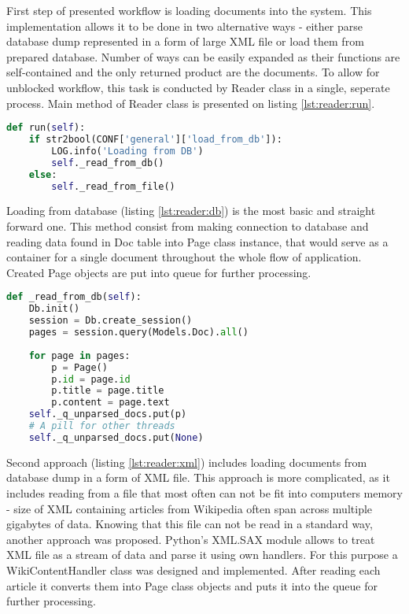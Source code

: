 First step of presented workflow is loading documents into the system. This implementation allows it to be done in two alternative ways - either parse database dump represented in a form of large XML file or load them from prepared database. Number of ways can be easily expanded as their functions are self-contained and the only returned product are the documents. To allow for unblocked workflow, this task is conducted by Reader class in a single, seperate process. Main method of Reader class is presented on listing \ref{lst:reader:run}.


\begin{lstlisting}[language=Python, caption={Reader.run() - Reader class process main method}, label={lst:reader:run}]
def run(self):
    if str2bool(CONF['general']['load_from_db']):
        LOG.info('Loading from DB')
        self._read_from_db()
    else:
        self._read_from_file()
\end{lstlisting}

Loading from database (listing \ref{lst:reader:db}) is the most basic and straight forward one. This method consist from making connection to database and reading data found in Doc table into Page class instance, that would serve as a container for a single document throughout the whole flow of application. Created Page objects are put into queue for further processing.

\begin{lstlisting}[language=Python, caption={Reader.\_read\_from\_db() - reading docs from database}, label={lst:reader:db}]
def _read_from_db(self):
	Db.init()
	session = Db.create_session()
	pages = session.query(Models.Doc).all()
	
	for page in pages:
		p = Page()
		p.id = page.id
		p.title = page.title
		p.content = page.text
	self._q_unparsed_docs.put(p)
	# A pill for other threads
	self._q_unparsed_docs.put(None)
\end{lstlisting}

Second approach (listing \ref{lst:reader:xml}) includes loading documents from database dump in a form of XML file. This approach is more complicated, as it includes reading from a file that most often can not be fit into computers memory - size of XML containing articles from Wikipedia often span across multiple gigabytes of data. Knowing that this file can not be read in a standard way, another approach was proposed. Python's XML.SAX module allows to treat XML file as a stream of data and parse it using own handlers. For this purpose a WikiContentHandler class was designed and implemented. After reading each article it converts them into Page class objects and puts it into the queue for further processing.

